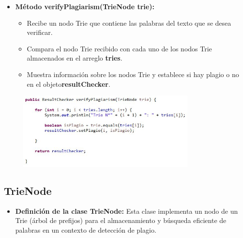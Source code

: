 \documentclass{article}
\begin{document}
	\begin{itemize}
	\item \textbf{Método verifyPlagiarism(TrieNode trie):}
	 \begin{itemize}
	 \item Recibe un nodo Trie que contiene las palabras del texto que se desea verificar.
	 \item Compara el nodo Trie recibido con cada uno de los nodos Trie almacenados en el arreglo \textbf{tries}.
	 \item Muestra información sobre los nodos Trie y establece si hay plagio o no en el objeto\textbf{resultChecker}.
	 \end{itemize}
	\end{itemize}
	 \begin{figure}[H]
		\centering
		\includegraphics[width=0.8\textwidth,keepaspectratio]{img/PC6.jpg}
	\end{figure}
	
	 \subsection{TrieNode}
	 \begin{itemize}
	\item \textbf{Definición de la clase TrieNode:} Esta clase implementa un nodo de un Trie (árbol de prefijos) para el almacenamiento y búsqueda eficiente de palabras en un contexto de detección de plagio.
	\end{itemize}
	
\end{document}
